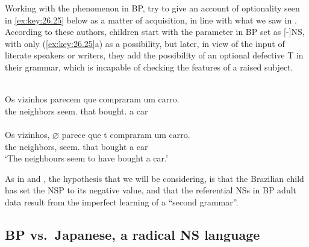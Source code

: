 \documentclass[output=paper]{langsci/langscibook}
\begin{document}
Working with the  phenomenon in \gls{BP},
\citet{MartinsNunes2009} try to give an account of optionality seen in
\eqref{ex:key:26.25} below as a matter of acquisition, in line with what we saw
in .  According to these authors, children start with the
parameter in \gls{BP} set as [-]NS, with only
(\ref{ex:key:26.25}a) as a possibility, but later, in view of the input of
literate speakers or writers, they add the possibility of an optional defective
T in their grammar, which is incapable of  checking  the features of a raised
subject.

\ea%
    \label{ex:key:26.25}
    \ea     \textcite{MartinsNunes2009}\\
	\gll	Os vizinhos    parecem    que compraram um carro.\\
            the neighbors seem.\Tpl{} that bought.\Tpl{}  a car\\
    \ex     \textcite{MartinsNunes2005}\\
	\gll	Os vizinhos, \textbf{$\varnothing$}\textbf{} parece     que t compraram um carro.\\
            the neighbors, {} seem.\Tsg{}    that {} bought        a car\\
	\glt	\enquote*{The neighbours seem to have bought a car.}

    \z
\z

As in \citet{MartinsNunes2009} and \citet{Kato2011}, the hypothesis that we
will be considering, is that the Brazilian child has set the \gls{NSP} to its
negative value, and that the referential NSs in \gls{BP} adult data result from the imperfect learning of a “second
grammar”.

\subsection{BP vs.\ Japanese, a radical NS language}\label{sec:key:26.3.2}
\end{document}
